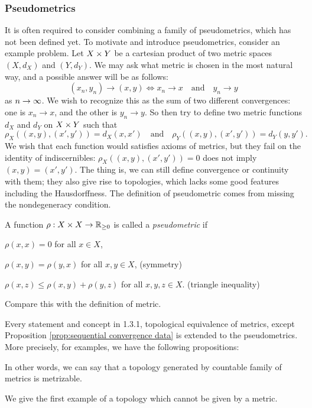 \subsubsection{Pseudometrics}
It is often required to consider combining a family of pseudometrics, which has not been defined yet.
To motivate and introduce pseudometrics, consider an example problem.
Let $X\times Y$ be a cartesian product of two metric spaces $(X,d_X)$ and $(Y,d_Y)$.
We may ask what metric is chosen in the most natural way, and a possible answer will be as follows:
\[(x_n,y_n)\to(x,y)\iff x_n\to x\quad\text{and}\quad y_n\to y\]
as $n\to\oo$.
We wish to recognize this as the sum of two different convergences: one is $x_n\to x$, and the other is $y_n\to y$.
So then try to define two metric functions $d_X$ and $d_Y$ on $X\times Y$ such that
\[\rho_X((x,y),(x',y'))=d_X(x,x')\quad\text{and}\quad\rho_Y((x,y),(x',y'))=d_Y(y,y').\]
We wish that each function would satisfies axioms of metrics, but they fail on the identity of indiscernibles: $\rho_X((x,y),(x',y'))=0$ does not imply $(x,y)=(x',y')$.
The thing is, we can still define convergence or continuity with them; they also give rise to topologies, which lacks some good features including the Hausdorffness.
The definition of pseudometric comes from missing the nondegeneracy condition.

\begin{defn}
A function $\rho:X\x X\to\R_{\ge0}$ is called a \emph{pseudometric} if
\begin{cond}
\item $\rho(x,x)=0$ for all $x\in X$,
\item $\rho(x,y)=\rho(y,x)$ for all $x,y\in X$, \hfill(symmetry)
\item $\rho(x,z)\le \rho(x,y)+\rho(y,z)$ for all $x,y,z\in X$. \hfill(triangle inequality)
\end{cond}
\end{defn}
Compare this with the definition of metric.

Every statement and concept in 1.3.1, topological equivalence of metrics, except Proposition \ref{prop:sequential convergence data} is extended to the pseudometrics.
More precisely, for examples, we have the following propositions:




In other words, we can say that a topology generated by countable family of metrics is metrizable.

We give the first example of a topology which cannot be given by a metric.

